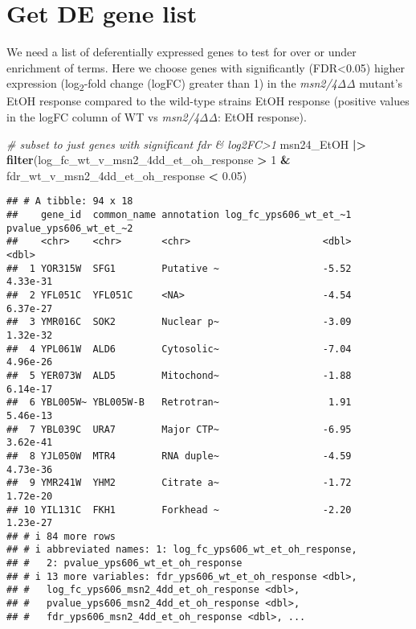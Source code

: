 \documentclass[
]{book}
\newenvironment{Shaded}{\begin{snugshade}}{\end{snugshade}}
\newcommand{\CommentTok}[1]{\textcolor[rgb]{0.56,0.35,0.01}{\textit{#1}}}
\newcommand{\DecValTok}[1]{\textcolor[rgb]{0.00,0.00,0.81}{#1}}
\newcommand{\FloatTok}[1]{\textcolor[rgb]{0.00,0.00,0.81}{#1}}
\newcommand{\FunctionTok}[1]{\textcolor[rgb]{0.13,0.29,0.53}{\textbf{#1}}}
\newcommand{\NormalTok}[1]{#1}
\newcommand{\SpecialCharTok}[1]{\textcolor[rgb]{0.81,0.36,0.00}{\textbf{#1}}}
\begin{document}
\hypertarget{get-de-gene-list}{%
\section{Get DE gene list}\label{get-de-gene-list}}

We need a list of deferentially expressed genes to test for over or under enrichment of terms. Here we choose genes with significantly (FDR\textless0.05) higher expression (log\textsubscript{2}-fold change (logFC) greater than 1) in the \emph{msn2/4ΔΔ} mutant's EtOH response compared to the wild-type strains EtOH response (positive values in the logFC column of WT vs \emph{msn2/4ΔΔ}: EtOH response).

\begin{Shaded}
\begin{Highlighting}[]
\CommentTok{\# subset to just genes with significant fdr \& log2FC\textgreater{}1}
\NormalTok{msn24\_EtOH }\SpecialCharTok{|\textgreater{}}
  \FunctionTok{filter}\NormalTok{(log\_fc\_wt\_v\_msn2\_4dd\_et\_oh\_response }\SpecialCharTok{\textgreater{}} \DecValTok{1} \SpecialCharTok{\&}\NormalTok{ fdr\_wt\_v\_msn2\_4dd\_et\_oh\_response }\SpecialCharTok{\textless{}} \FloatTok{0.05}\NormalTok{) }
\end{Highlighting}
\end{Shaded}

\begin{verbatim}
## # A tibble: 94 x 18
##    gene_id  common_name annotation log_fc_yps606_wt_et_~1 pvalue_yps606_wt_et_~2
##    <chr>    <chr>       <chr>                       <dbl>                  <dbl>
##  1 YOR315W  SFG1        Putative ~                  -5.52               4.33e-31
##  2 YFL051C  YFL051C     <NA>                        -4.54               6.37e-27
##  3 YMR016C  SOK2        Nuclear p~                  -3.09               1.32e-32
##  4 YPL061W  ALD6        Cytosolic~                  -7.04               4.96e-26
##  5 YER073W  ALD5        Mitochond~                  -1.88               6.14e-17
##  6 YBL005W~ YBL005W-B   Retrotran~                   1.91               5.46e-13
##  7 YBL039C  URA7        Major CTP~                  -6.95               3.62e-41
##  8 YJL050W  MTR4        RNA duple~                  -4.59               4.73e-36
##  9 YMR241W  YHM2        Citrate a~                  -1.72               1.72e-20
## 10 YIL131C  FKH1        Forkhead ~                  -2.20               1.23e-27
## # i 84 more rows
## # i abbreviated names: 1: log_fc_yps606_wt_et_oh_response,
## #   2: pvalue_yps606_wt_et_oh_response
## # i 13 more variables: fdr_yps606_wt_et_oh_response <dbl>,
## #   log_fc_yps606_msn2_4dd_et_oh_response <dbl>,
## #   pvalue_yps606_msn2_4dd_et_oh_response <dbl>,
## #   fdr_yps606_msn2_4dd_et_oh_response <dbl>, ...
\end{verbatim}
\end{document}
